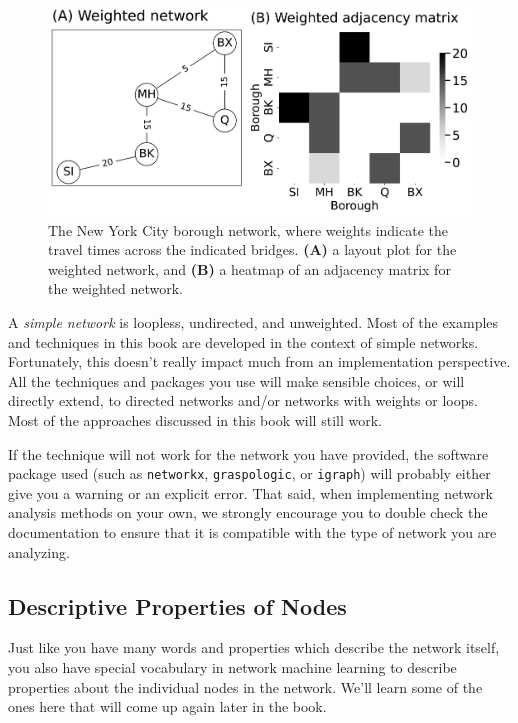 \begin{figure}
    \centering
    \includegraphics[width=0.8\linewidth]{representations/ch4/Images/weighted.png}
    \caption[Weighted network in New York borough example]{The New York City borough network, where weights indicate the travel times across the indicated bridges. \textbf{(A)} a layout plot for the weighted network, and \textbf{(B)} a heatmap of an adjacency matrix for the weighted network.}
    \label{fig:ch4:weighted}
\end{figure}

\begin{floatingbox}[h]\caption{This book considers {simple networks}}
A \textit{simple network} is loopless, undirected, and unweighted. Most of the examples and techniques in this book are developed in the context of simple networks. Fortunately, this doesn't really impact much from an implementation perspective. All the techniques and packages you use will make sensible choices, or will directly extend, to directed networks and/or networks with weights or loops. Most of the approaches discussed in this book will still work. 

If the technique will not work for the network you have provided, the software package used (such as \texttt{networkx}, \texttt{graspologic}, or \texttt{igraph}) will probably either give you a warning or an explicit error. That said, when implementing network analysis methods on your own, we strongly encourage you to double check the documentation to ensure that it is {compatible} with the type of network you are analyzing.
\end{floatingbox}

\subsection{Descriptive Properties of Nodes}

Just like you have many words and properties which describe the network itself, you also have special vocabulary in network machine learning to describe properties about the individual nodes in the network. We'll learn some of the ones here that will come up again later in the book.

